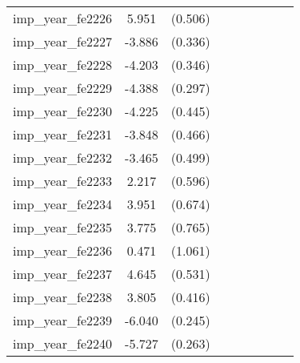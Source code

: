 {\begin{tabular}{l*{4}{cc}}
imp\_year\_fe2226&    5.951\sym{***}&  (0.506)&                  &         &                  &         &                  &         \\
imp\_year\_fe2227&   -3.886\sym{***}&  (0.336)&                  &         &                  &         &                  &         \\
imp\_year\_fe2228&   -4.203\sym{***}&  (0.346)&                  &         &                  &         &                  &         \\
imp\_year\_fe2229&   -4.388\sym{***}&  (0.297)&                  &         &                  &         &                  &         \\
imp\_year\_fe2230&   -4.225\sym{***}&  (0.445)&                  &         &                  &         &                  &         \\
imp\_year\_fe2231&   -3.848\sym{***}&  (0.466)&                  &         &                  &         &                  &         \\
imp\_year\_fe2232&   -3.465\sym{***}&  (0.499)&                  &         &                  &         &                  &         \\
imp\_year\_fe2233&    2.217\sym{***}&  (0.596)&                  &         &                  &         &                  &         \\
imp\_year\_fe2234&    3.951\sym{***}&  (0.674)&                  &         &                  &         &                  &         \\
imp\_year\_fe2235&    3.775\sym{***}&  (0.765)&                  &         &                  &         &                  &         \\
imp\_year\_fe2236&    0.471         &  (1.061)&                  &         &                  &         &                  &         \\
imp\_year\_fe2237&    4.645\sym{***}&  (0.531)&                  &         &                  &         &                  &         \\
imp\_year\_fe2238&    3.805\sym{***}&  (0.416)&                  &         &                  &         &                  &         \\
imp\_year\_fe2239&   -6.040\sym{***}&  (0.245)&                  &         &                  &         &                  &         \\
imp\_year\_fe2240&   -5.727\sym{***}&  (0.263)&                  &         &                  &         &                  &         \\

\end{tabular}}
